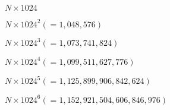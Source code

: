 \documentclass{article}
\begin{document}
$N\times1024$
\pagebreak

$N\times1024^2(=1,048,576)$
\pagebreak

$N\times1024^3(=1,073,741,824)$
\pagebreak

$N\times1024^4(=1,099,511,627,776)$
\pagebreak

$N\times1024^5(=1,125,899,906,842,624)$
\pagebreak

$N\times1024^6(=1,152,921,504,606,846,976)$
\pagebreak
\end{document}
